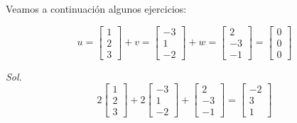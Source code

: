 Veamos a continuación algunos ejercicios:

\begin{problem}
\begin{equation*}
	u=\begin{bmatrix} 1\\ 2\\ 3 \end{bmatrix} + v=\begin{bmatrix} -3\\ 1\\ -2 \end{bmatrix} + w=\begin{bmatrix} 2\\ -3\\ -1 \end{bmatrix} = \begin{bmatrix} 0\\ 0\\ 0 \end{bmatrix}
\end{equation*}
\end{problem}

\textit{ Sol. }
\begin{equation*}
	2\begin{bmatrix} 1\\ 2\\ 3 \end{bmatrix} + 2\begin{bmatrix} -3\\ 1\\ -2 \end{bmatrix} + \begin{bmatrix} 2\\ -3\\ -1 \end{bmatrix} = \begin{bmatrix} -2\\ 3\\ 1 \end{bmatrix}
\end{equation*}


